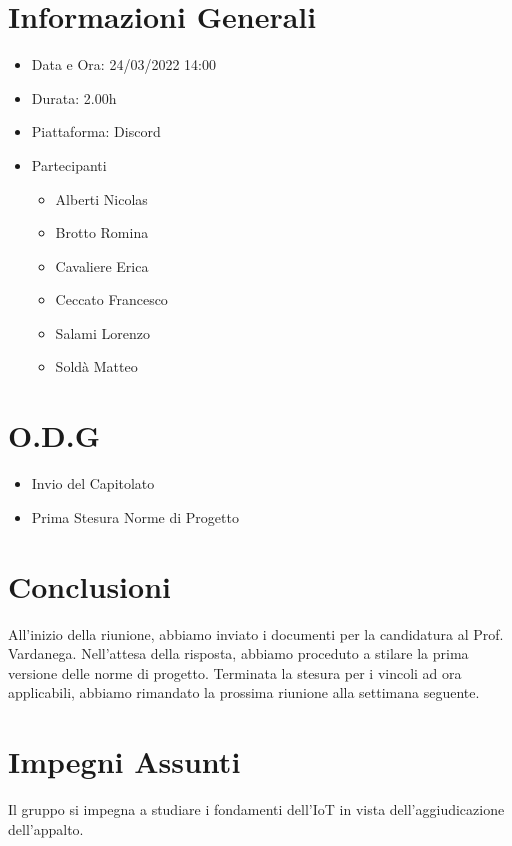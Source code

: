 \documentclass[a4paper, 12pt]{article}
\begin{document}
\makefrontpage

\section*{Informazioni Generali}
\begin{itemize}
    \item Data e Ora: 24/03/2022 14:00
    \item Durata: 2.00h
    \item Piattaforma: Discord
    \item Partecipanti
    \begin{itemize}
        \item Alberti Nicolas
        \item Brotto Romina
        \item Cavaliere Erica
        \item Ceccato Francesco
        \item Salami Lorenzo
        \item Soldà Matteo
    \end{itemize}
\end{itemize}

\section*{O.D.G}
\begin{itemize}
    \item Invio del Capitolato
    \item Prima Stesura Norme di Progetto
\end{itemize}
\section*{Conclusioni}
All'inizio della riunione, abbiamo inviato i documenti per la candidatura al Prof. Vardanega. Nell'attesa della risposta, abbiamo proceduto a stilare la prima versione delle norme di progetto.
Terminata la stesura per i vincoli ad ora applicabili, abbiamo rimandato la prossima riunione alla settimana seguente.

\section*{Impegni Assunti}
Il gruppo si impegna a studiare i fondamenti dell'IoT in vista dell'aggiudicazione dell'appalto.
\end{document}
